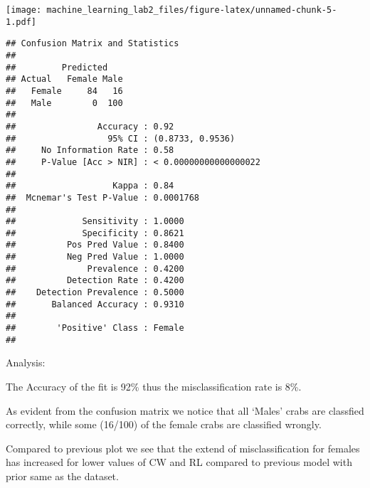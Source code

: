 \documentclass[]{article}
\newenvironment{Shaded}{\begin{snugshade}}{\end{snugshade}}
\newcommand{\KeywordTok}[1]{\textcolor[rgb]{0.13,0.29,0.53}{\textbf{#1}}}
\newcommand{\StringTok}[1]{\textcolor[rgb]{0.31,0.60,0.02}{#1}}
\newcommand{\OperatorTok}[1]{\textcolor[rgb]{0.81,0.36,0.00}{\textbf{#1}}}
\newcommand{\NormalTok}[1]{#1}
\begin{document}
\texttt{[image: machine\_learning\_lab2\_files/figure-latex/unnamed-chunk-5-1.pdf]}

\begin{Shaded}
\end{Shaded}

\begin{verbatim}
## Confusion Matrix and Statistics
## 
##         Predicted
## Actual   Female Male
##   Female     84   16
##   Male        0  100
##                                                
##                Accuracy : 0.92                 
##                  95% CI : (0.8733, 0.9536)     
##     No Information Rate : 0.58                 
##     P-Value [Acc > NIR] : < 0.00000000000000022
##                                                
##                   Kappa : 0.84                 
##  Mcnemar's Test P-Value : 0.0001768            
##                                                
##             Sensitivity : 1.0000               
##             Specificity : 0.8621               
##          Pos Pred Value : 0.8400               
##          Neg Pred Value : 1.0000               
##              Prevalence : 0.4200               
##          Detection Rate : 0.4200               
##    Detection Prevalence : 0.5000               
##       Balanced Accuracy : 0.9310               
##                                                
##        'Positive' Class : Female               
## 
\end{verbatim}

Analysis:

The Accuracy of the fit is 92\% thus the misclassification rate is 8\%.

As evident from the confusion matrix we notice that all `Males' crabs
are classfied correctly, while some (16/100) of the female crabs are
classified wrongly.

Compared to previous plot we see that the extend of misclassification
for females has increased for lower values of CW and RL compared to
previous model with prior same as the dataset.
\end{document}
